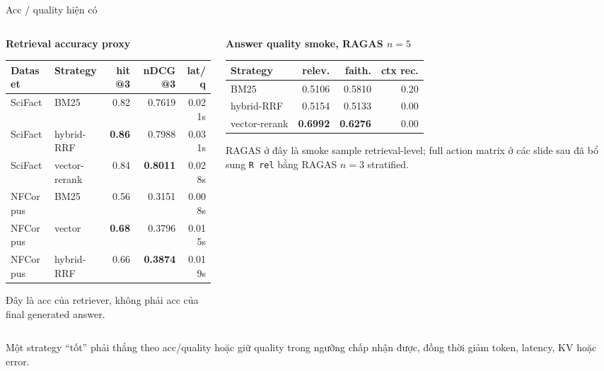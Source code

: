 \documentclass[aspectratio=169,10pt]{beamer}
\newcommand{\smallcode}[1]{\texttt{\scriptsize #1}}
\newcommand{\minihead}[1]{{\bfseries\color{AccentDark}#1}}
\newcommand{\takeaway}[1]{%
  \vspace{0.46em}
  \noindent\colorbox{Soft}{%
    \parbox{\dimexpr\linewidth-2\fboxsep}{\color{Ink}\strut #1\strut}%
  }%
}
\begin{document}
\begin{frame}{Acc / quality hiện có}
  \scriptsize
  \begin{columns}[T,onlytextwidth]
    \begin{column}{0.51\textwidth}
      \minihead{Retrieval accuracy proxy}\\[-0.08cm]
      \renewcommand{\arraystretch}{1.12}
      \setlength{\tabcolsep}{3.4pt}
      \begin{tabular}{l l r r r}
        \toprule
        Dataset & Strategy & hit@3 & nDCG@3 & lat/q \\
        \midrule
        SciFact & BM25 & 0.82 & 0.7619 & 0.021s \\
        SciFact & hybrid-RRF & \textbf{0.86} & 0.7988 & 0.031s \\
        SciFact & vector-rerank & 0.84 & \textbf{0.8011} & 0.028s \\
        NFCorpus & BM25 & 0.56 & 0.3151 & 0.008s \\
        NFCorpus & vector & \textbf{0.68} & 0.3796 & 0.015s \\
        NFCorpus & hybrid-RRF & 0.66 & \textbf{0.3874} & 0.019s \\
        \bottomrule
      \end{tabular}\par
      \vspace{0.18cm}
      \footnotesize\color{Muted}
      Đây là acc của retriever, không phải acc của final generated answer.
    \end{column}
    \begin{column}{0.45\textwidth}
      \minihead{Answer quality smoke, RAGAS \(n=5\)}\\[-0.08cm]
      \renewcommand{\arraystretch}{1.12}
      \setlength{\tabcolsep}{3.2pt}
      \begin{tabular}{l r r r}
        \toprule
        Strategy & relev. & faith. & ctx rec. \\
        \midrule
        BM25 & 0.5106 & 0.5810 & 0.20 \\
        hybrid-RRF & 0.5154 & 0.5133 & 0.00 \\
        vector-rerank & \textbf{0.6992} & \textbf{0.6276} & 0.00 \\
        \bottomrule
      \end{tabular}\par
      \vspace{0.20cm}
      \footnotesize\color{Muted}
      RAGAS ở đây là smoke sample retrieval-level; full action matrix ở các slide sau đã bổ sung \smallcode{R rel} bằng RAGAS \(n=3\) stratified.
    \end{column}
  \end{columns}
  \takeaway{\scriptsize Một strategy ``tốt'' phải thắng theo acc/quality hoặc giữ quality trong ngưỡng chấp nhận được, đồng thời giảm token, latency, KV hoặc error.}
\end{frame}
\end{document}
